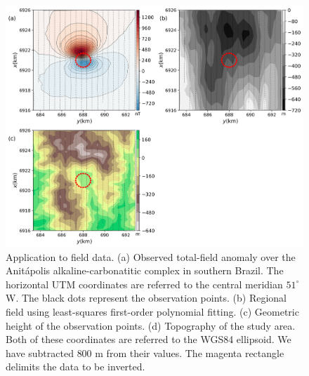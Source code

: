 \begin{figure}
    \centering
    \includegraphics[width=\linewidth]{figures/field_data_alt_topo.png}
    \caption{Application to field data.  (a) Observed total-field anomaly over the  
    Anit{\'a}polis alkaline-carbonatitic complex in southern Brazil. The horizontal UTM 
    coordinates are referred to the central meridian $ 51^\circ $ W. 
    The black dots represent the observation points.
    (b) Regional field using least-squares first-order polynomial fitting. 
    (c) Geometric height of the observation points. (d) Topography of the study area.
    Both of these coordinates are referred to the WGS84 ellipsoid. We have subtracted 
    $ 800 $ m from their values. 
    The magenta rectangle delimits the data to be inverted.
    }
    \label{fig:real_data}
\end{figure}

